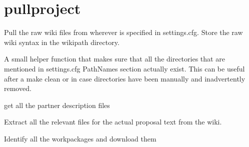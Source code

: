 \documentclass[a4paper,10pt,english]{sphinxmanual}
\begin{document}
\section{pullproject}
\label{sourcecodedoc:module-pullProject}\label{sourcecodedoc:pullproject}
Pull the raw wiki files from wherever is specified in
settings.cfg. Store the raw wiki syntax in the wikipath directory.

\begin{fulllineitems}
\label{sourcecodedoc:pullProject.ensureDirectories}
A small helper function that makes sure that all the
directories that are mentioned in settings.cfg PathNames section
actually exist. This can be useful after a make clean or in case
directories have been manually and inadvertently removed.

\end{fulllineitems}


\begin{fulllineitems}
\label{sourcecodedoc:pullProject.getPartners}
get all the partner description files

\end{fulllineitems}


\begin{fulllineitems}
\label{sourcecodedoc:pullProject.getProposalStructure}
Extract all the relevant files for the actual proposal text from the wiki.

\end{fulllineitems}


\begin{fulllineitems}
\label{sourcecodedoc:pullProject.getWorkpackages}
Identify all the workpackages and download them

\end{fulllineitems}
\end{document}
